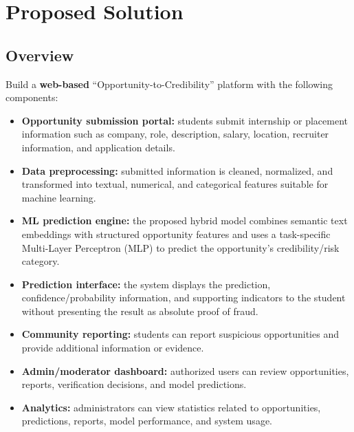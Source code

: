 \documentclass[11pt,a4paper]{article}
\newcommand{\BvrHint}[1]{%
  {\normalfont\normalsize\itshape\hfill #1}}
\begin{document}
\section{Proposed Solution%
\BvrHint{}}

\subsection{Overview}

Build a \textbf{web-based} ``Opportunity-to-Credibility'' platform with the
following components:

\begin{itemize}[leftmargin=0.7cm]

    \item \textbf{Opportunity submission portal:} students submit internship
    or placement information such as company, role, description, salary,
    location, recruiter information, and application details.

    \item \textbf{Data preprocessing:} submitted information is cleaned,
    normalized, and transformed into textual, numerical, and categorical
    features suitable for machine learning.

    \item \textbf{ML prediction engine:} the proposed hybrid model combines
    semantic text embeddings with structured opportunity features and uses a
    task-specific Multi-Layer Perceptron (MLP) to predict the opportunity's
    credibility/risk category.

    \item \textbf{Prediction interface:} the system displays the prediction,
    confidence/probability information, and supporting indicators to the
    student without presenting the result as absolute proof of fraud.

    \item \textbf{Community reporting:} students can report suspicious
    opportunities and provide additional information or evidence.

    \item \textbf{Admin/moderator dashboard:} authorized users can review
    opportunities, reports, verification decisions, and model predictions.

    \item \textbf{Analytics:} administrators can view statistics related to
    opportunities, predictions, reports, model performance, and system usage.
\end{itemize}
\end{document}

